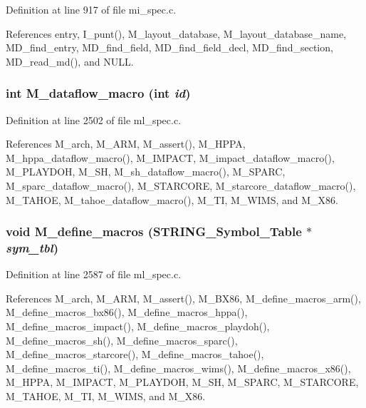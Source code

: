 Definition at line 917 of file mi\_\-spec.c.

References entry, I\_\-punt(), M\_\-layout\_\-database, M\_\-layout\_\-database\_\-name, MD\_\-find\_\-entry, MD\_\-find\_\-field, MD\_\-find\_\-field\_\-decl, MD\_\-find\_\-section, MD\_\-read\_\-md(), and NULL.
\subsubsection{\setlength{\rightskip}{0pt plus 5cm}int M\_\-dataflow\_\-macro (int {\em id})}\label{m__spec_8h_9e2d030328725b623a16731f21483104}




Definition at line 2502 of file ml\_\-spec.c.

References M\_\-arch, M\_\-ARM, M\_\-assert(), M\_\-HPPA, M\_\-hppa\_\-dataflow\_\-macro(), M\_\-IMPACT, M\_\-impact\_\-dataflow\_\-macro(), M\_\-PLAYDOH, M\_\-SH, M\_\-sh\_\-dataflow\_\-macro(), M\_\-SPARC, M\_\-sparc\_\-dataflow\_\-macro(), M\_\-STARCORE, M\_\-starcore\_\-dataflow\_\-macro(), M\_\-TAHOE, M\_\-tahoe\_\-dataflow\_\-macro(), M\_\-TI, M\_\-WIMS, and M\_\-X86.
\subsubsection{\setlength{\rightskip}{0pt plus 5cm}void M\_\-define\_\-macros (\bf{STRING\_\-Symbol\_\-Table} $\ast$ {\em sym\_\-tbl})}\label{m__spec_8h_8af52b7802fdefa7d7e8bb29484b11dd}




Definition at line 2587 of file ml\_\-spec.c.

References M\_\-arch, M\_\-ARM, M\_\-assert(), M\_\-BX86, M\_\-define\_\-macros\_\-arm(), M\_\-define\_\-macros\_\-bx86(), M\_\-define\_\-macros\_\-hppa(), M\_\-define\_\-macros\_\-impact(), M\_\-define\_\-macros\_\-playdoh(), M\_\-define\_\-macros\_\-sh(), M\_\-define\_\-macros\_\-sparc(), M\_\-define\_\-macros\_\-starcore(), M\_\-define\_\-macros\_\-tahoe(), M\_\-define\_\-macros\_\-ti(), M\_\-define\_\-macros\_\-wims(), M\_\-define\_\-macros\_\-x86(), M\_\-HPPA, M\_\-IMPACT, M\_\-PLAYDOH, M\_\-SH, M\_\-SPARC, M\_\-STARCORE, M\_\-TAHOE, M\_\-TI, M\_\-WIMS, and M\_\-X86.
